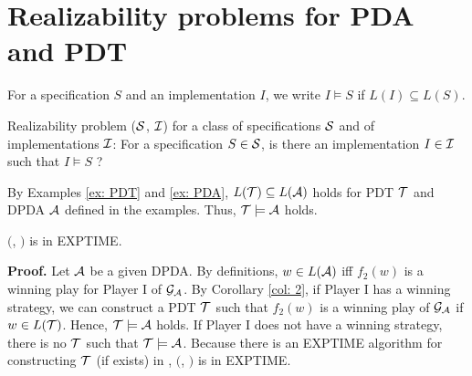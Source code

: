 \section{Realizability problems for PDA and PDT}
For a specification $S$ and an implementation $I$,
we write $I \models S$ if $L(I) \subseteq L(S)$.

\begin{definition}
Realizability problem \Real (${\cal S}$, ${\cal I}$) for a class of specifications ${\cal S}$ and of implementations ${\cal I}$: For a specification $S\in{\cal S}$, is there an implementation $I\in{\cal I}$ such that $I \models S$ ?
\end{definition}

\begin{example}
By Examples \ref{ex: PDT} and \ref{ex: PDA},
$L({\cal T})\subseteq L({\cal A})$ holds for PDT ${\cal T}$ and DPDA ${\cal A}$
defined in the examples.
Thus, ${\cal T}\models{\cal A}$ holds.
\end{example}

\begin{theorem}\label{the: DPDA}
\Real $($\DPDA, \PDT$)$ is in EXPTIME.
\end{theorem}
{\bf Proof.}\quad
Let ${\cal A}$ be a given DPDA.
By definitions, $w\in L({\cal A})$ iff
$f_2(w)$ is a winning play for Player I of ${\cal G}_{\cal A}$.
By Corollary \ref{col: 2},
if Player I has a winning strategy,
we can construct a PDT ${\cal T}$ such that
$f_2(w)$ is a winning play of ${\cal G}_{\cal A}$ if $w\in L({\cal T})$.
Hence, ${\cal T}\models{\cal A}$ holds.
If Player I does not have a winning strategy, there is no ${\cal T}$ such that ${\cal T} \models {\cal A}$.
Because there is an EXPTIME algorithm for constructing ${\cal T}$ (if exists)
in \cite{Wa96}, \Real $($\DPDA, \PDT$)$ is in EXPTIME.

